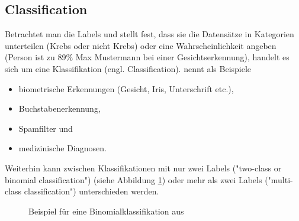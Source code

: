 \subsection{Classification} \label{subsubsec:classification}
Betrachtet man die Labels und stellt fest, dass sie die Datensätze in Kategorien unterteilen (Krebs oder nicht Krebs) oder eine Wahrscheinlichkeit angeben (Person ist zu 89\% Max Mustermann bei einer Gesichtserkennung), handelt es sich um eine Klassifikation (engl. Classification).\citep[S.~67]{swamynathan_mastering_2017} \citep[S.~5]{kauchak_neural_2016} nennt als Beispiele
\begin{itemize}
\item biometrische Erkennungen (Gesicht, Iris, Unterschrift etc.),
\item Buchstabenerkennung,
\item Spamfilter und
\item medizinische Diagnosen.
\end{itemize}
Weiterhin kann zwischen Klassifikationen mit nur zwei Labels ("two-class or binomial classification"\citep{ericson_how_2017}) (siehe Abbildung \ref{fig:classification}) oder mehr als zwei Labels ("multi-class classification"\citep{ericson_how_2017}) unterschieden werden.
\begin{figure}[H]
\centering
{}
\caption{Beispiel für eine Binomialklassifikation aus \citep[S.~8]{suthaharan_machine_2016}}
\label{fig:classification}
\end{figure}

